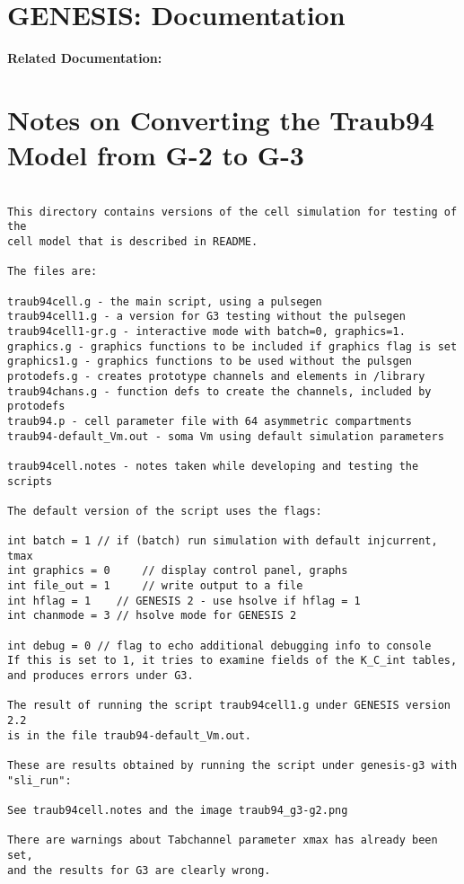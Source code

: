 \documentclass[12pt]{article}
\begin{document}
\section*{GENESIS: Documentation}

{\bf Related Documentation:}

\section*{Notes on Converting the Traub94 Model from G-2 to G-3}

\begin{verbatim}

This directory contains versions of the cell simulation for testing of the
cell model that is described in README.

The files are:

traub94cell.g - the main script, using a pulsegen
traub94cell1.g - a version for G3 testing without the pulsegen
traub94cell1-gr.g - interactive mode with batch=0, graphics=1.
graphics.g - graphics functions to be included if graphics flag is set
graphics1.g - graphics functions to be used without the pulsgen
protodefs.g - creates prototype channels and elements in /library
traub94chans.g - function defs to create the channels, included by protodefs
traub94.p - cell parameter file with 64 asymmetric compartments
traub94-default_Vm.out - soma Vm using default simulation parameters

traub94cell.notes - notes taken while developing and testing the scripts

The default version of the script uses the flags:

int batch = 1 // if (batch) run simulation with default injcurrent, tmax
int graphics = 0     // display control panel, graphs
int file_out = 1     // write output to a file
int hflag = 1    // GENESIS 2 - use hsolve if hflag = 1
int chanmode = 3 // hsolve mode for GENESIS 2

int debug = 0 // flag to echo additional debugging info to console
If this is set to 1, it tries to examine fields of the K_C_int tables,
and produces errors under G3.

The result of running the script traub94cell1.g under GENESIS version 2.2
is in the file traub94-default_Vm.out.

These are results obtained by running the script under genesis-g3 with
"sli_run":

See traub94cell.notes and the image traub94_g3-g2.png

There are warnings about Tabchannel parameter xmax has already been set,
and the results for G3 are clearly wrong.

\end{verbatim}
\end{document}
